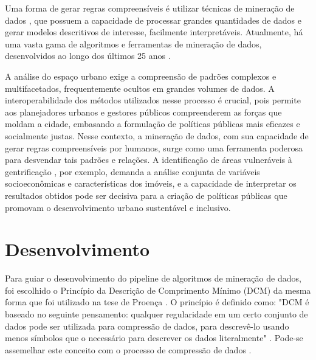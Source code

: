 \documentclass[12pt]{article}
\begin{document}
Uma forma de gerar regras compreensíveis é utilizar técnicas de mineração de dados \cite{zaki2014data}, que possuem a capacidade de processar grandes quantidades de dados e gerar modelos descritivos de interesse, facilmente interpretáveis. Atualmente, há uma vasta gama de algoritmos e ferramentas \cite{mikut2011data} de mineração de dados, desenvolvidos ao longo dos últimos 25 anos \cite{luna2019frequent}. %

A análise do espaço urbano exige a compreensão de padrões complexos e multifacetados, frequentemente ocultos em grandes volumes de dados. A interoperabilidade dos métodos utilizados nesse processo é crucial, pois permite aos planejadores urbanos e gestores públicos compreenderem as forças que moldam a cidade, embasando a formulação de políticas públicas mais eficazes e socialmente justas. Nesse contexto, a mineração de dados, com sua capacidade de gerar regras compreensíveis por humanos, surge como uma ferramenta poderosa para desvendar tais padrões e relações. A identificação de áreas vulneráveis à gentrificação \cite{andrade2020urban}, por exemplo, demanda a análise conjunta de variáveis socioeconômicas e características dos imóveis, e a capacidade de interpretar os resultados obtidos pode ser decisiva para a criação de políticas públicas que promovam o desenvolvimento urbano sustentável e inclusivo.

\section{Desenvolvimento}

Para guiar o desenvolvimento do pipeline de algoritmos de mineração de dados, foi escolhido o Princípio da Descrição de Comprimento Mínimo (DCM) da mesma forma que foi utilizado na tese de Proença \cite{proencca2021robust}.  O princípio é definido como: "DCM é baseado no seguinte pensamento: qualquer regularidade em um certo conjunto de dados pode ser utilizada para compressão de dados, para descrevê-lo usando menos símbolos que o necessário para descrever os dados literalmente" \cite{grunwald2007minimum}. Pode-se assemelhar este conceito com o processo de compressão de dados  \cite{proencca2021robust}.
\end{document}
